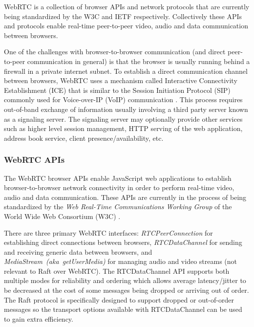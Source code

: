 \documentclass[conference,compsoc]{./IEEEtran/IEEEtran}
\begin{document}
WebRTC is a collection of browser APIs \cite{webrtc:feb2015} and network protocols \cite{draft-rtcweb-overview} that are currently being standardized by the W3C and IETF respectively. Collectively these APIs and protocols enable real-time peer-to-peer video, audio and data communication between browsers.

One of the challenges with browser-to-browser communication (and direct peer-to-peer communication in general) is that the browser is usually running behind a firewall in a private internet subnet. To establish a direct communication channel between browsers, WebRTC uses a mechanism called Interactive Connectivity Establishment (ICE) that is similar to the Session Initiation Protocol (SIP) commonly used for Voice-over-IP (VoIP) communication \cite{RFC5245:ice}. This process requires out-of-band exchange of information usually involving a third party server known as a signaling server. The signaling server may optionally provide other services such as higher level session management, HTTP serving of the web application, address book service, client presence/availability, etc.

\subsubsection{WebRTC APIs}

The WebRTC browser APIs enable JavaScript web applications to establish browser-to-browser network connectivity in order to perform real-time video, audio and data communication. These APIs are currently in the process of being standardized by the \emph{Web Real-Time Communications Working Group} of the World Wide Web Consortium (W3C) \cite{webrtc:wg}.

There are three primary WebRTC interfaces: \emph{RTCPeerConnection} \cite{webrtc:rtcpeerconnection:feb2015} for establishing direct connections between browsers, \emph{RTCDataChannel} \cite{webrtc:datachannel:feb2015} for sending and receiving generic data between browsers, and \emph{MediaStream~(aka~getUserMedia)} for managing audio and video streams (not relevant to Raft over WebRTC). The RTCDataChannel API supports both multiple modes for reliability and ordering which allows average latency/jitter to be decreased at the cost of some messages being dropped or arriving out of order. The Raft protocol is specifically designed to support dropped or out-of-order messages so the transport options available with RTCDataChannel can be used to gain extra efficiency.
\end{document}
